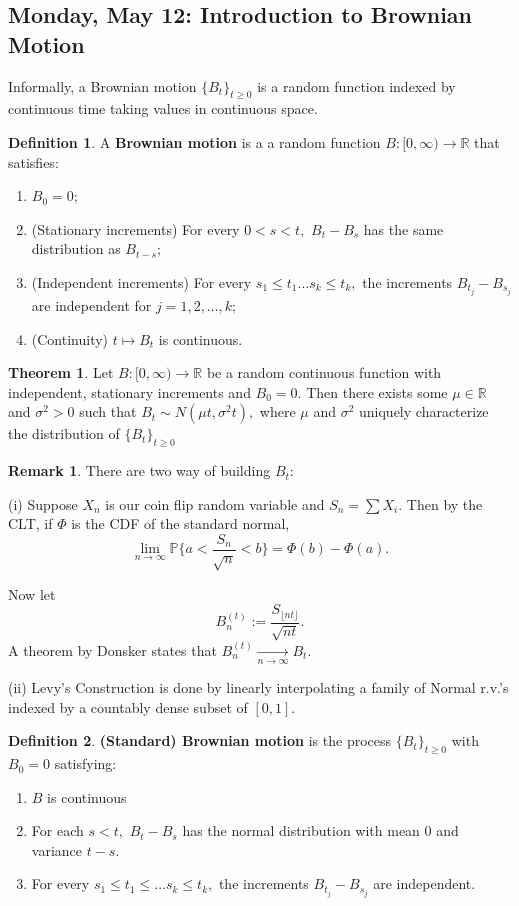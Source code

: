 \documentclass[10pt, oneside]{article}
\newcommand{\bbR}{\mathbb{R}}
\newcommand{\bbP}{\mathbb{P}}
\theoremstyle{definition}
\newtheorem{thm}{Theorem}
\newtheorem{defn}{Definition}
\newtheorem{rem}{Remark}
\begin{document}
\subsection{Monday, May 12: Introduction to Brownian Motion}
Informally, a Brownian motion $\{B_t\}_{t\geq 0}$ is a random function indexed by continuous time taking values in continuous space. 
\begin{defn}
    A \textbf{Brownian motion} is a a random function $B: [0,\infty) \to \bbR$ that satisfies:
    \begin{enumerate}
        \item $B_0 = 0;$
        \item (Stationary increments) For every $0< s< t,$ $B_t - B_s$ has the same distribution as $B_{t-s};$
        \item (Independent increments) For every $s_1 \leq t_1 \dots s_k \leq t_k,$ the increments $B_{t_j} - B_{s_j}$ are independent for $j = 1,2,\dots, k;$
        \item (Continuity) $t\mapsto B_t$ is continuous. 
    \end{enumerate}
\end{defn}
\begin{thm}
    Let $B: [0, \infty) \to \bbR$ be a random continuous function with independent, stationary increments and $B_0 = 0.$ Then there exists some $\mu \in \bbR$ and $\sigma^2 >0$ such that $B_t \sim N(\mu t, \sigma^2 t),$ where $\mu$ and $\sigma^2$ uniquely characterize the distribution of $\{B_t\}_{t\geq 0}$
\end{thm}
\begin{rem}
There are two way of building $B_t:$

   (i) Suppose $X_n$ is our coin flip random variable and $S_n = \sum X_i.$ Then by the CLT, if $\Phi$ is the CDF of the standard normal,
    \[\lim_{n\to \infty}\bbP\{a < \frac{S_n}{\sqrt{n}} < b\} = \Phi(b) - \Phi(a).\]

    Now let 
    \[B_n^{(t)} := \frac{S_{\lfloor nt\rfloor}}{\sqrt{nt}}.\] A theorem by Donsker states that $B_n^{(t)}\xrightarrow[n\to \infty]{}B_t.$

    (ii) Levy's Construction is done by linearly interpolating a family of Normal r.v.'s indexed by a countably dense subset of $[0,1].$
\end{rem}
\begin{defn}
    \textbf{(Standard) Brownian motion} is the process $\{B_t\}_{t\geq 0}$ with $B_0 = 0$ satisfying:
    \begin{enumerate}
        \item $B$ is continuous
        \item For each $s<t,$ $B_t - B_s$ has the normal distribution with mean $0$ and variance $t - s.$
        \item For every $s_1 \leq t_1 \leq \dots s_k \leq t_k,$ the increments $B_{t_j} - B_{s_j}$ are independent.
    \end{enumerate}
\end{defn}
\end{document}
